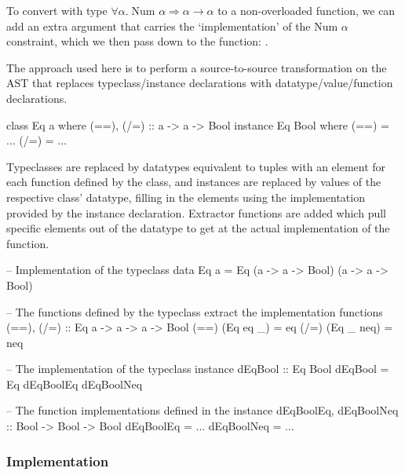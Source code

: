 \documentclass[dissertation.tex]{subfiles}
\begin{document}
{{{            To convert  with type \(\forall \alpha.\; \text{Num }\alpha \Rightarrow
            \alpha\rightarrow\alpha\) to a non-overloaded function, we can add an extra argument that carries the
            `implementation' of the \(\text{Num }\alpha\) constraint, which we then pass down to the \haskell{(+)}
            function: .

            The approach used here is to perform a source-to-source transformation on the AST that replaces
            typeclass/instance declarations with datatype/value/function declarations.

            \begin{haskellfigure}
            class Eq a where
                (==), (/=) :: a -> a -> Bool
            instance Eq Bool where
                (==) = ...
                (/=) = ...
            \end{haskellfigure}

            Typeclasses are replaced by datatypes equivalent to tuples with an element for each function defined by the
            class, and instances are replaced by values of the respective class' datatype, filling in the elements using
            the implementation provided by the instance declaration. Extractor functions are added which pull specific
            elements out of the datatype to get at the actual implementation of the function.

            \begin{haskellfigure}
            -- Implementation of the typeclass
            data Eq a = Eq (a -> a -> Bool) (a -> a -> Bool)

            -- The functions defined by the typeclass extract the implementation functions
            (==), (/=) :: Eq a -> a -> a -> Bool
            (==) (Eq eq _) = eq
            (/=) (Eq _ neq) = neq

            -- The implementation of the typeclass instance
            dEqBool :: Eq Bool
            dEqBool = Eq dEqBoolEq dEqBoolNeq

            -- The function implementations defined in the instance
            dEqBoolEq, dEqBoolNeq :: Bool -> Bool -> Bool
            dEqBoolEq = ...
            dEqBoolNeq = ...
            \end{haskellfigure}
        }
        \subsubsection{Implementation}
        {

}}}
\end{document}

